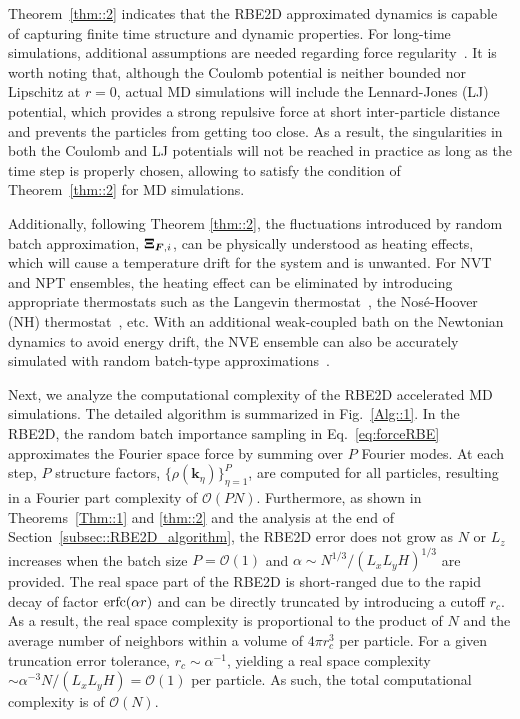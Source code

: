 Theorem~\ref{thm::2} indicates that the RBE2D approximated dynamics is capable of capturing finite time structure and dynamic properties.
For long-time simulations, additional assumptions are needed regarding force regularity~\cite{jin2022random}. 
It   {is worth} noting that, although the Coulomb potential is neither bounded nor Lipschitz at $r=0$, actual MD simulations will include the Lennard-Jones (LJ) potential, which provides a  {strong repulsive force at short inter-particle distance and prevents the particles from getting too close. As a result, the singularities in both the Coulomb and LJ potentials will not be reached in practice as long as the time step is properly chosen, allowing to satisfy the condition of Theorem~\ref{thm::2}  for MD simulations.}

Additionally, following Theorem \ref{thm::2}, the fluctuations introduced by random batch approximation, $\boldsymbol{\Xi}_{\boldsymbol{F},i}$,  can be physically understood as heating effects, which will cause a temperature drift for the system and is unwanted. 
For NVT and NPT ensembles, the heating effect can be eliminated by introducing appropriate thermostats such as the Langevin thermostat~\cite{feller1995constant}, the Nos\'e-Hoover (NH) thermostat~\cite{hoover1985canonical}, etc. With an additional weak-coupled bath on the Newtonian dynamics to avoid energy drift, the NVE ensemble can also be accurately simulated with random batch-type approximations~\cite{liang2024JCP}.

Next, we analyze the computational complexity of the RBE2D accelerated MD simulations. The detailed algorithm is summarized in Fig.~\ref{Alg::1}.  
In the RBE2D, the random batch importance sampling in Eq.~\eqref{eq:forceRBE} approximates the Fourier space force by summing over $P$ Fourier modes. 
At each step, $P$ structure factors, $\{\rho(\bm{k}_{\eta})\}_{\eta=1}^{P}$, are computed for all particles, resulting in a Fourier part complexity of $\mathcal{O}(PN)$. Furthermore, as shown in Theorems~\ref{Thm::1} and \ref{thm::2} and the analysis at the end of Section~\ref{subsec::RBE2D_algorithm}, the RBE2D error does not grow as $N$ or $L_z$ increases when the batch size $P=\mathcal{O}(1)$ and $\alpha\sim N^{1/3}/(L_xL_yH)^{1/3}$ are provided. 
The real space part of the RBE2D is short-ranged due to the rapid decay of factor $\operatorname{erfc}(\alpha r)$ and can be directly truncated by introducing a cutoff $r_c$. 
As a result, the real space complexity is proportional to the product of $N$ and the average number of neighbors within a volume of $4\pi r_c^3$ per particle. 
For a given truncation error tolerance, $r_c\sim \alpha^{-1}$, yielding a real space complexity $\sim \alpha^{-3}N/(L_xL_yH)=\mathcal{O}(1)$ per particle. 
As such, the total computational complexity is of $\mathcal{O}(N)$. 

